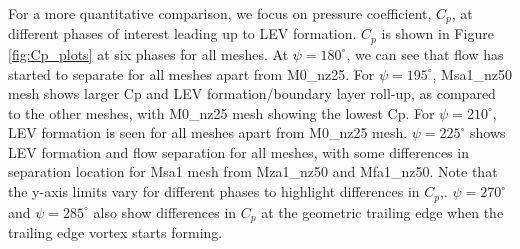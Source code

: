 For a more quantitative comparison, we focus on pressure coefficient, $C_p$,  at different phases of interest leading up to LEV formation. $C_p$ is shown in Figure \ref{fig:Cp_plots} at six phases for all meshes. At $\psi=180^\circ$, we can see that flow has started to separate for all meshes apart from M0\_nz25. For $\psi=195^\circ$, Msa1\_nz50 mesh shows larger Cp and LEV formation/boundary layer roll-up, as compared to the other meshes, with M0\_nz25 mesh showing the lowest Cp. For $\psi=210^\circ$, LEV formation is seen for all meshes apart from M0\_nz25 mesh. $\psi=225^\circ$ shows LEV formation and flow separation for all meshes, with some differences in separation location for Msa1 mesh from Mza1\_nz50 and Mfa1\_nz50. Note that the y-axis limits vary for different phases to highlight differences in $C_p$,.
$\psi=270^\circ$ and $\psi=285^\circ$ also show differences in $C_p$ at the geometric trailing edge when the trailing edge vortex starts forming. 



